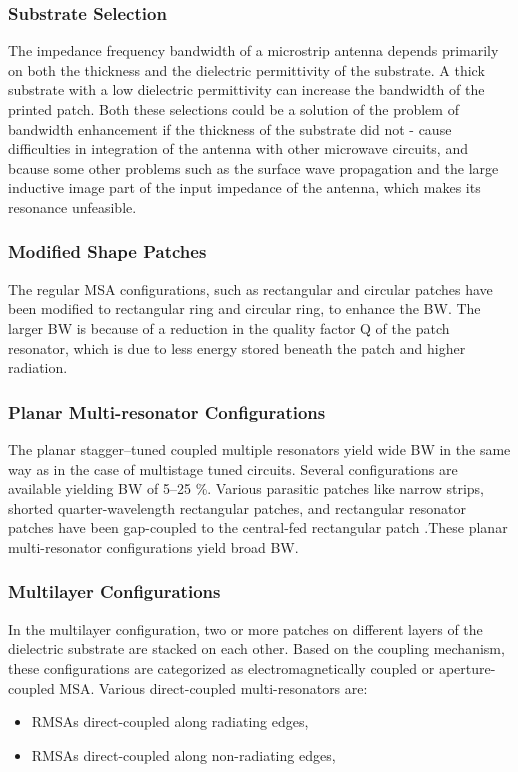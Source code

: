   \subsubsection{ Substrate Selection}
   \justify
    The impedance frequency bandwidth of a microstrip antenna depends primarily on both the thickness and the dielectric permittivity of the substrate. A thick substrate with a low dielectric permittivity can increase the bandwidth of the printed patch. Both these selections could be a solution of the problem of bandwidth enhancement if the thickness of the substrate did not - cause difficulties in integration of the antenna with other microwave circuits, and  bcause some other problems such as the surface wave propagation and the large inductive image part of the input impedance of the antenna, which makes its resonance unfeasible.\\
 \subsubsection{Modified Shape Patches}
   \justify
    The regular MSA configurations, such as rectangular and circular patches have been modified to rectangular ring and circular ring, to enhance the BW. The larger BW is because of a reduction in the quality factor Q of the patch resonator, which is due to less energy stored beneath the patch and higher radiation.\\
  \subsubsection{ Planar Multi-resonator Configurations}
      \justify
     The planar stagger–tuned coupled multiple resonators yield wide BW in the same way as in the case of multistage tuned circuits. Several configurations are available yielding BW of 5–25 \%. Various parasitic patches like narrow strips, shorted quarter-wavelength rectangular patches, and rectangular resonator patches have been gap-coupled to the central-fed rectangular patch .These planar multi-resonator configurations yield broad BW.
 \subsubsection{Multilayer Configurations}
  \justify
    In the multilayer configuration, two or more patches on different layers of the dielectric substrate are stacked on each other. Based on the coupling mechanism, these configurations are categorized as electromagnetically coupled or aperture-coupled MSA.
    Various direct-coupled multi-resonators are:
    \begin{itemize}
    	\item    RMSAs direct-coupled along radiating edges,
    	\item    RMSAs direct-coupled along non-radiating edges,
    \end{itemize}
